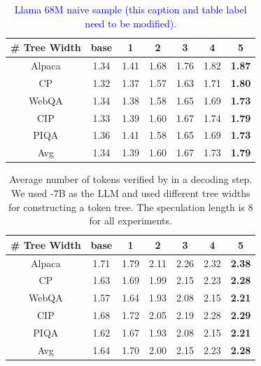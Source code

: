 \begin{table}
\begin{center}
\caption{\textcolor{blue}{Llama 68M naive sample (this caption and table label need to be modified).}}
\footnotesize
\label{tab:cbt-llama}
\begin{tabular}{ccccccc}
\toprule
\# Tree Width  &base    & 1 & 2 & 3 & 4 & 5 \\ \midrule
Alpaca     &1.34     & 1.41     & 1.68    & 1.76     & 1.82     & \textbf{1.87}     \\
CP         &1.32     & 1.37     & 1.57    & 1.63     & 1.71     & \textbf{1.80}     \\
WebQA      &1.34     & 1.38     & 1.58    & 1.65     & 1.69     & \textbf{1.73}     \\
CIP        &1.33     & 1.39     & 1.60    & 1.67     & 1.74     & \textbf{1.79}     \\
PIQA       &1.36     & 1.41     & 1.58    & 1.65     & 1.69     & \textbf{1.73}         \\ \midrule
Avg        &1.34     & 1.39     & 1.60    & 1.67     & 1.73     & \textbf{1.79}      \\ \bottomrule
\end{tabular}
\end{center}
\end{table}
\fi 


\begin{table}
\begin{center}
\caption{Average number of tokens verified by \sys in a decoding step.  We used \llama-7B as the LLM and used different tree widths for constructing a token tree. The speculation length is 8 for all experiments.}
\label{tab:cbt-llama}
\begin{tabular}{ccccccc}
\toprule
\# Tree Width  & base   & 1 & 2 & 3 & 4 & 5 \\ \midrule
Alpaca     &1.71     & 1.79     & 2.11    & 2.26     & 2.32     & \textbf{2.38}     \\
CP         &1.63     & 1.69     & 1.99    & 2.15     & 2.23     & \textbf{2.28}     \\
WebQA      &1.57     & 1.64     & 1.93    & 2.08     & 2.15     & \textbf{2.21}     \\
CIP        &1.68     & 1.72     & 2.05    & 2.19     & 2.28     & \textbf{2.29}     \\
PIQA       &1.62     & 1.67     & 1.93    & 2.08     & 2.15     & \textbf{2.21}         \\ \midrule
Avg        &1.64     & 1.70     & 2.00    & 2.15     & 2.23     & \textbf{2.28}      \\ \bottomrule
\end{tabular}
\end{center}
\end{table}

